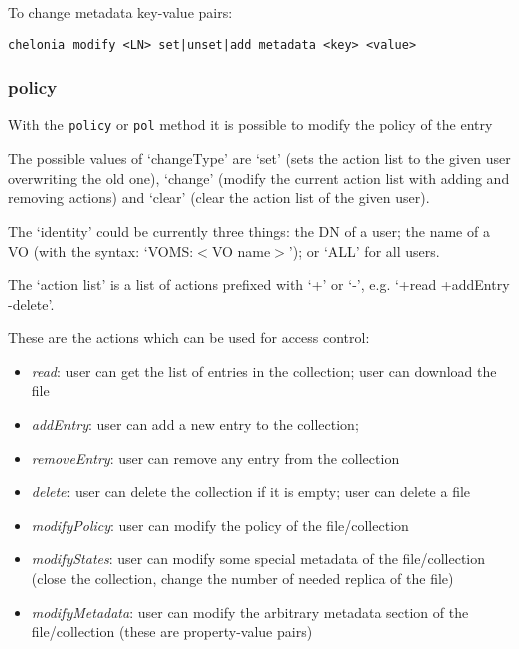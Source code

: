 To change metadata key-value pairs:
\begin{verbatim}
chelonia modify <LN> set|unset|add metadata <key> <value>    
\end{verbatim}

\subsubsection{policy} %
\label{ssub:policy}

With the \texttt{policy} or \texttt{pol} method it is possible to modify the policy of the entry
\hspace*{0.5cm}
\begin{shaded}
\end{shaded}

The possible values of `changeType' are `set' (sets the action list to the given user overwriting the old one), `change' (modify the current action list with adding and removing actions) and `clear' (clear the action list of the given user).

The `identity' could be currently three things: the DN of a user; the name of a VO (with the syntax: `VOMS:$<$VO name$>$'); or `ALL' for all users.

The `action list' is a list of actions prefixed with `+' or `-', e.g. `+read +addEntry -delete'.

These are the actions which can be used for access control:
\begin{itemize}
    \item \emph{read}: user can get the list of entries in the collection; user can download the file
    \item \emph{addEntry}: user can add a new entry to the collection;
    \item \emph{removeEntry}: user can remove any entry from the collection 
    \item \emph{delete}: user can delete the collection if it is empty; user can delete a file
    \item \emph{modifyPolicy}: user can modify the policy of the file/collection
    \item \emph{modifyStates}: user can modify some special metadata of the file/collection (close the collection, change the number of needed replica of the file)
    \item \emph{modifyMetadata}: user can modify the arbitrary metadata section of the file/collection (these are property-value pairs)
\end{itemize}

